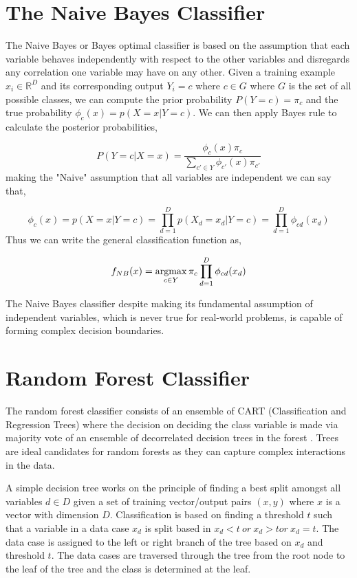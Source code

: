 \documentclass[proposal]{umassthesis}
\begin{document}
\section{The Naive Bayes Classifier }

The Naive Bayes or Bayes optimal classifier \cite{zhang2004optimality} is based on the assumption that each variable behaves independently with respect to the other variables and disregards any correlation one variable may have on any other. Given a training example $x_i \in \mathbb{R}^D$ and its corresponding output $Y_i = c$ where $c \in G$ where $G$ is the set of all possible classes, we can compute the prior probability $P(Y = c) = \pi_c$ and the true probability $\phi_c(x) = p(X = x | Y = c)$.  We can then apply Bayes rule to calculate the posterior probabilities,

\begin{equation}
P(Y = c | X = x) = \dfrac{\phi_c(x) \pi_c}{\sum_{c' \in Y}\phi_{c'}(x) \pi_{c'}}
\end{equation}
making the "Naive" assumption that all variables are independent we can say that,

\begin{equation}
\phi_c(x) = p(X = x | Y = c) = \prod_{d=1}^{D} p(X_d = x_d | Y = c) = \prod_{d=1}^{D}\phi_{cd}(x_d)
\end{equation}
Thus we can write the general classification function as,

\begin{equation}
f_{NB}(x) = \operatornamewithlimits{argmax}\limits_{c \in Y} \pi_c \prod_{d = 1}^{D} \phi_{cd}(x_d)
\end{equation}

The Naive Bayes classifier despite making its fundamental assumption of independent variables, which is never true for real-world problems, is capable of forming complex decision boundaries.

\section{Random Forest Classifier}
The random forest classifier consists of an ensemble of CART (Classification and Regression Trees) where the decision on deciding the class variable is made via majority vote of an ensemble of decorrelated decision trees in the forest \cite{breiman2001random}. Trees are ideal candidates for random forests as they can capture complex interactions in the data.

A simple decision tree works on the principle of finding a best split amongst all variables $d \in D$ given a set of training vector/output pairs $(x,y)$ where $x$ is a vector with dimension $D$. Classification is based on finding a threshold $t$ such that a variable in a data case $x_d$ is split based in $x_d < t \ or \ x_d > t or \ x_d =t$. The data case is assigned to the left or right branch of the tree based on $x_d$ and threshold $t$. The data cases are traversed through the tree from the root node to the leaf of the tree and the class is determined at the leaf.
\end{document}
